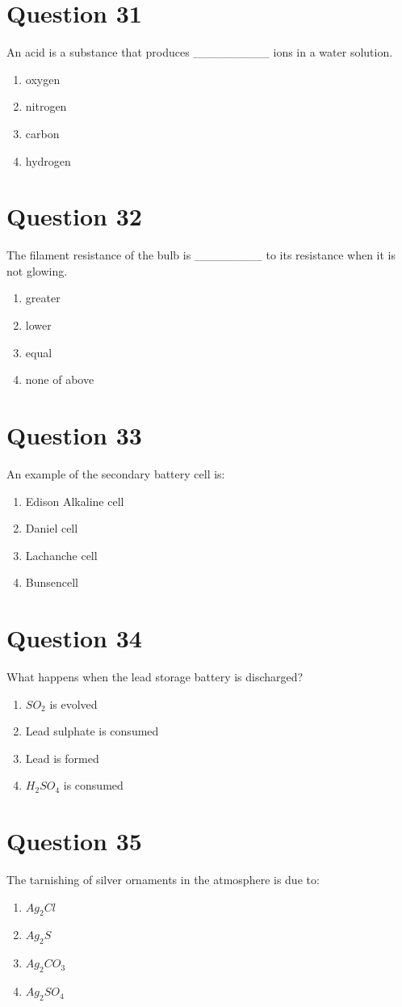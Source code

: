 \documentclass{article}
\begin{document}
\section*{Question 31}
An acid is a substance that produces _________ ions in a water solution.
\begin{enumerate}[label=(\alph*)]
\item oxygen
\item nitrogen
\item carbon
\item hydrogen
\end{enumerate}
\newpage
\section*{Question 32}
The filament resistance of the bulb is ________ to its resistance when it is not glowing.
\begin{enumerate}[label=(\alph*)]
\item greater
\item lower
\item equal
\item none of above
\end{enumerate}
\newpage
\section*{Question 33}
An example of the secondary battery cell is:
\begin{enumerate}[label=(\alph*)]
\item Edison Alkaline cell
\item Daniel cell
\item Lachanche cell
\item Bunsencell
\end{enumerate}
\newpage
\section*{Question 34}
What happens when the lead storage battery is discharged?
\begin{enumerate}[label=(\alph*)]
\item \(SO _2\) is evolved
\item Lead sulphate is consumed
\item Lead is formed
\item \(H _2 SO _4\) is consumed
\end{enumerate}
\newpage
\section*{Question 35}
The tarnishing of silver ornaments in the atmosphere is due to:
\begin{enumerate}[label=(\alph*)]
\item \(Ag _2 Cl\)
\item \(Ag _2 S\)
\item \(Ag _2 CO _3\)
\item \(Ag _2 SO _4\)
\end{enumerate}
\newpage
\end{document}
